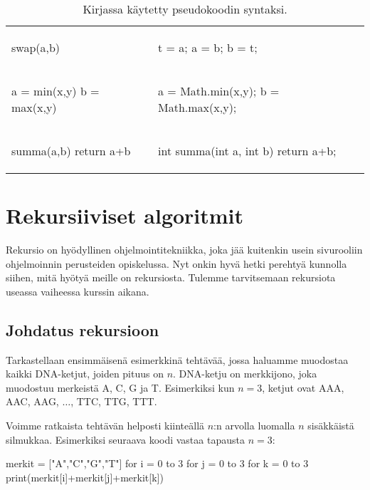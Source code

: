 \begin{table}
\begin{tabular}{ll}
\begin{smallcode}[xleftmargin=0pt]
swap(a,b)
\end{smallcode}
&
\begin{smallcode}
t = a;
a = b;
b = t;
\end{smallcode}
\\
\begin{smallcode}[xleftmargin=0pt]
a = min(x,y)
b = max(x,y)
\end{smallcode}
&
\begin{smallcode}
a = Math.min(x,y);
b = Math.max(x,y);
\end{smallcode}
\\
\begin{smallcode}[xleftmargin=0pt]
summa(a,b)
    return a+b
\end{smallcode}
&
\begin{smallcode}
int summa(int a, int b) {
    return a+b;
}
\end{smallcode}
\\
\end{tabular}
\caption{Kirjassa käytetty pseudokoodin syntaksi.}
\label{tab:psekoo}
\end{table}

\section{Rekursiiviset algoritmit}

Rekursio on hyödyllinen ohjelmointitekniikka,
joka jää kuitenkin usein sivurooliin ohjelmoinnin perusteiden opiskelussa.
Nyt onkin hyvä hetki perehtyä kunnolla siihen,
mitä hyötyä meille on rekursiosta.
Tulemme tarvitsemaan rekursiota useassa vaiheessa kurssin aikana.

\subsection{Johdatus rekursioon}

Tarkastellaan ensimmäisenä esimerkkinä tehtävää,
jossa haluamme muodostaa kaikki DNA-ketjut,
joiden pituus on $n$.
DNA-ketju on merkkijono, joka muodostuu merkeistä A, C, G ja T.
Esimerkiksi kun $n=3$, ketjut ovat AAA, AAC, AAG, $\dots$, TTC, TTG, TTT.

Voimme ratkaista tehtävän helposti kiinteällä $n$:n arvolla
luomalla $n$ sisäk\-käistä silmukkaa.
Esimerkiksi seuraava koodi vastaa tapausta $n=3$:

\begin{code}
merkit = ["A","C","G","T"]
for i = 0 to 3
    for j = 0 to 3
        for k = 0 to 3
            print(merkit[i]+merkit[j]+merkit[k])
\end{code}

